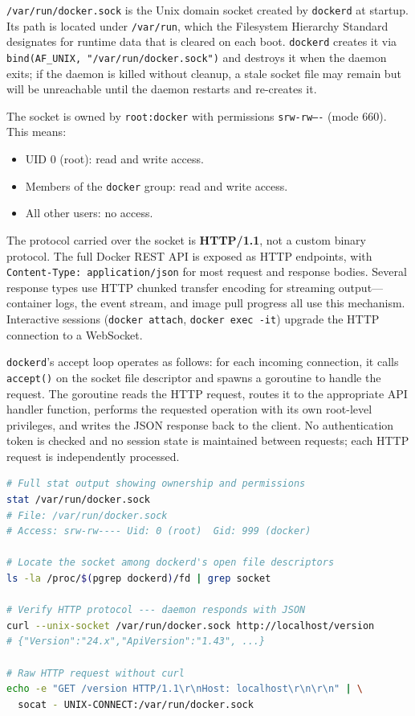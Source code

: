 \texttt{/var/run/docker.sock} is the Unix domain socket created by \texttt{dockerd}
at startup. Its path is located under \texttt{/var/run}, which the Filesystem
Hierarchy Standard designates for runtime data that is cleared on each boot.
\texttt{dockerd} creates it via \texttt{bind(AF\_UNIX, "/var/run/docker.sock")} and
destroys it when the daemon exits; if the daemon is killed without cleanup, a stale
socket file may remain but will be unreachable until the daemon restarts and
re-creates it.

The socket is owned by \texttt{root:docker} with permissions \texttt{srw-rw----}
(mode 660). This means:

\begin{itemize}
    \item UID 0 (root): read and write access.
    \item Members of the \texttt{docker} group: read and write access.
    \item All other users: no access.
\end{itemize}

The protocol carried over the socket is \textbf{HTTP/1.1}, not a custom binary
protocol. The full Docker REST API is exposed as HTTP endpoints, with
\texttt{Content-Type: application/json} for most request and response bodies. Several
response types use HTTP chunked transfer encoding for streaming output---container
logs, the event stream, and image pull progress all use this mechanism. Interactive
sessions (\texttt{docker attach}, \texttt{docker exec -it}) upgrade the HTTP
connection to a WebSocket.

\texttt{dockerd}'s accept loop operates as follows: for each incoming connection, it
calls \texttt{accept()} on the socket file descriptor and spawns a goroutine to handle
the request. The goroutine reads the HTTP request, routes it to the appropriate API
handler function, performs the requested operation with its own root-level privileges,
and writes the JSON response back to the client. No authentication token is checked
and no session state is maintained between requests; each HTTP request is
independently processed.

\begin{lstlisting}[language=bash, caption={Inspecting \texttt{docker.sock} ownership and protocol}]
# Full stat output showing ownership and permissions
stat /var/run/docker.sock
# File: /var/run/docker.sock
# Access: srw-rw---- Uid: 0 (root)  Gid: 999 (docker)

# Locate the socket among dockerd's open file descriptors
ls -la /proc/$(pgrep dockerd)/fd | grep socket

# Verify HTTP protocol --- daemon responds with JSON
curl --unix-socket /var/run/docker.sock http://localhost/version
# {"Version":"24.x","ApiVersion":"1.43", ...}

# Raw HTTP request without curl
echo -e "GET /version HTTP/1.1\r\nHost: localhost\r\n\r\n" | \
  socat - UNIX-CONNECT:/var/run/docker.sock
\end{lstlisting}


